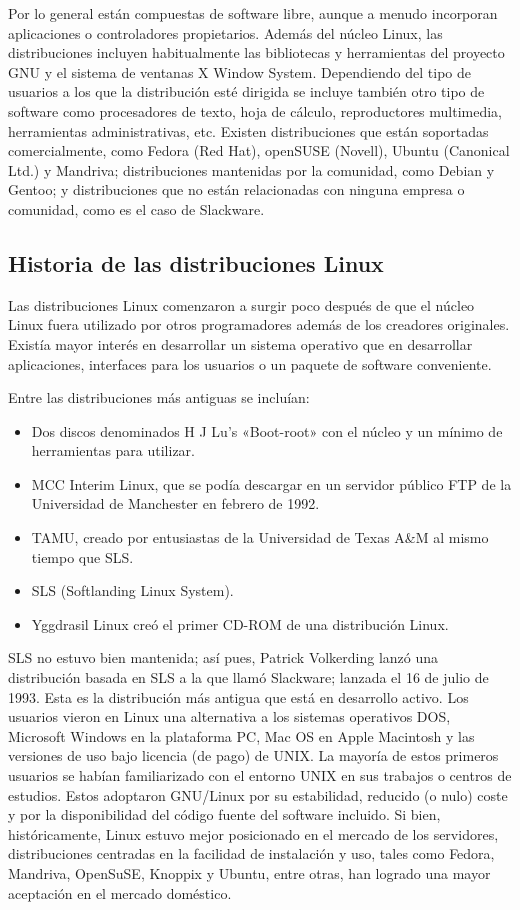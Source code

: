 Por lo general están compuestas de software libre, aunque a menudo incorporan aplicaciones o controladores propietarios.
Además del núcleo Linux, las distribuciones incluyen habitualmente las bibliotecas y herramientas del proyecto GNU y el sistema de ventanas X Window System. Dependiendo del tipo de usuarios a los que la distribución esté dirigida se incluye también otro tipo de software como procesadores de texto, hoja de cálculo, reproductores multimedia, herramientas administrativas, etc.
Existen distribuciones que están soportadas comercialmente, como Fedora (Red Hat), openSUSE (Novell), Ubuntu (Canonical Ltd.) y Mandriva; distribuciones mantenidas por la comunidad, como Debian y Gentoo; y distribuciones que no están relacionadas con ninguna empresa o comunidad, como es el caso de Slackware.

\subsection{Historia de las distribuciones Linux}
Las distribuciones Linux comenzaron a surgir poco después de que el núcleo Linux fuera utilizado por otros programadores además de los creadores originales. Existía mayor interés en desarrollar un sistema operativo que en desarrollar aplicaciones, interfaces para los usuarios o un paquete de software conveniente.

Entre las distribuciones más antiguas se incluían:

\begin{itemize}
	\item Dos discos denominados H J Lu's «Boot-root» con el núcleo y un mínimo de herramientas para utilizar.
	\item MCC Interim Linux, que se podía descargar en un servidor público FTP de la Universidad de Manchester en febrero de 1992.
	\item TAMU, creado por entusiastas de la Universidad de Texas A\&M al mismo tiempo que SLS.
	\item SLS (Softlanding Linux System).
	\item Yggdrasil Linux creó el primer CD-ROM de una distribución Linux.
\end{itemize}

SLS no estuvo bien mantenida; así pues, Patrick Volkerding lanzó una distribución basada en SLS a la que llamó Slackware; lanzada el 16 de julio de 1993. Esta es la distribución más antigua que está en desarrollo activo.
Los usuarios vieron en Linux una alternativa a los sistemas operativos DOS, Microsoft Windows en la plataforma PC, Mac OS en Apple Macintosh y las versiones de uso bajo licencia (de pago) de UNIX. La mayoría de estos primeros usuarios se habían familiarizado con el entorno UNIX en sus trabajos o centros de estudios. Estos adoptaron GNU/Linux por su estabilidad, reducido (o nulo) coste y por la disponibilidad del código fuente del software incluido.
Si bien, históricamente, Linux estuvo mejor posicionado en el mercado de los servidores, distribuciones centradas en la facilidad de instalación y uso, tales como Fedora, Mandriva, OpenSuSE, Knoppix y Ubuntu, entre otras, han logrado una mayor aceptación en el mercado doméstico.

